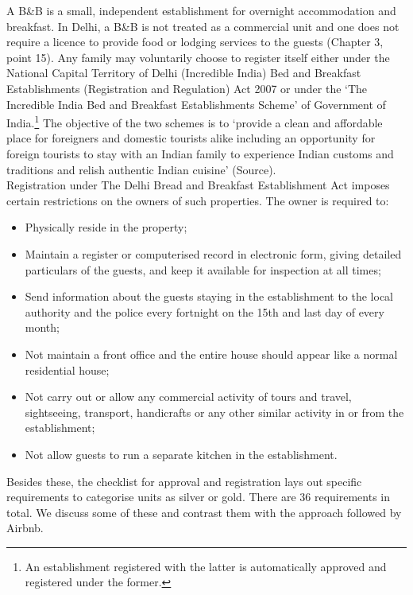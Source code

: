 \documentclass[a4paper, 12pt]{article}
\begin{document}
A B\&B is a small, independent establishment for overnight accommodation and breakfast. In Delhi, a B\&B is not treated as a commercial unit and one does not require a licence to provide food or lodging services to the guests (Chapter 3, point 15). Any family may voluntarily choose to register itself either under the National Capital Territory of Delhi (Incredible India) Bed and Breakfast Establishments (Registration and Regulation) Act 2007 or under the ‘The Incredible India Bed and Breakfast Establishments Scheme’ of Government of India.\footnote{An establishment registered with the latter is automatically approved and registered under the former.}  The objective of the two schemes is to ‘provide a clean and affordable place for foreigners and domestic tourists alike including an opportunity for foreign tourists to stay with an Indian family to experience Indian customs and traditions and relish authentic Indian cuisine’ (Source). \\
                    
  Registration under The Delhi Bread and Breakfast Establishment Act imposes certain restrictions on the owners of such properties. The owner is required to: 
\begin{itemize}
\item Physically reside in the property;
\item Maintain a register or computerised record in electronic form, giving detailed particulars of the guests, and keep it available for inspection at all times;
\item  Send information about the guests staying in the establishment to the local authority and the police every fortnight on the 15th and last day of every month;
\item Not maintain a front office and the entire house should appear like a normal residential house;
\item Not carry out or allow any commercial activity of tours and travel, sightseeing, transport, handicrafts or any other similar activity in or from the establishment;
\item  Not allow guests to run a separate kitchen in the establishment.
\end{itemize}                                  
Besides these, the checklist for approval and registration lays out specific requirements to categorise units as silver or gold. There are 36 requirements in total. We discuss some of these and contrast them with the approach followed by Airbnb.\\
\end{document}
